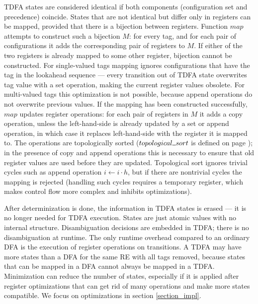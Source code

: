 \documentclass[]{article}
\newcommand{\Xund}{\rule{.5em}{.5pt}}
\begin{document}
TDFA states are considered identical if both components (configuration set and precedence) coincide.
States that are not identical but differ only in registers can be mapped, provided that there is a bijection between registers.
Function $map$ attempts to construct such a bijection $M$:
for every tag, and for each pair of configurations
it adds the corresponding pair of registers to $M$.
If either of the two registers is already mapped to some other register, bijection cannot be constructed.
For single-valued tags mapping ignores configurations that have the tag in the lookahead sequence ---
every transition out of TDFA state overwrites tag value with a set operation, making the current register values obsolete.
For multi-valued tags this optimization is not possible, because append operations do not overwrite previous values.
If the mapping has been constructed successfully, $map$ updates register operations:
for each pair of registers in $M$ it adds a copy operation,
unless the left-hand-side is already updated by a set or append operation,
in which case it replaces left-hand-side with the register it is mapped to.
The operations are topologically sorted ($topological \Xund sort$ is defined on page \pageref{alg_opt2});
in the presence of copy and append operations this is necessary to ensure that old register values are used before they are updated.
Topological sort ignores trivial cycles such as append operation $i \leftarrow i \cdot h$,
but if there are nontrivial cycles the mapping is rejected
(handling such cycles requires a temporary register, which makes control flow more complex and inhibits optimizations).
\medskip

After determinization is done, the information in TDFA states is erased --- it is no longer needed for TDFA execution.
States are just atomic values with no internal structure.
Disambiguation decisions are embedded in TDFA; there is no disambiguation at runtime.
The only runtime overhead compared to an ordinary DFA is the execution of register operations on transitions.
A TDFA may have more states than a DFA for the same RE with all tags removed, because states that can be mapped in a DFA cannot always be mapped in a TDFA.
Minimization can reduce the number of states,
especially if it is applied after register optimizations that can get rid of many operations and make more states compatible.
We focus on optimizations in section \ref{section_impl}.
\medskip
\end{document}
